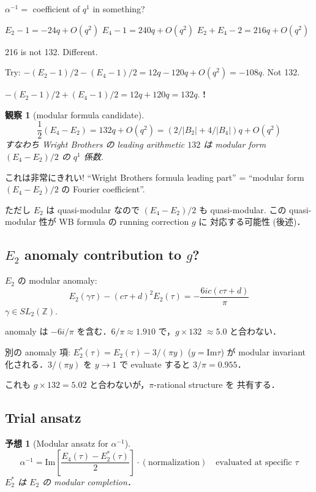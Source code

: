 \documentclass[11pt,a4paper]{article}
\newtheorem{observation}{観察}
\newtheorem{conjecture}{予想}
\begin{document}
$\alpha^{-1} = $ coefficient of $q^1$ in something?

$E_2 - 1 = -24 q + O(q^2)$
$E_4 - 1 = 240 q + O(q^2)$
$E_2 + E_4 - 2 = 216 q + O(q^2)$

216 is not 132. Different.

Try: $-(E_2 - 1)/2 - (E_4 - 1)/2 = 12 q - 120 q + O(q^2) = -108 q$. Not 132.

$-(E_2 - 1)/2 + (E_4 - 1)/2 = 12 q + 120 q = 132 q$. \textbf{!}

\begin{observation}[modular formula candidate]
\begin{equation}
\frac{1}{2}(E_4 - E_2) = 132 q + O(q^2) = (2/|B_2| + 4/|B_4|) q + O(q^2)
\end{equation}
すなわち Wright Brothers の leading arithmetic $132$ は modular form
$(E_4 - E_2)/2$ の $q^1$ 係数.
\end{observation}

これは非常にきれい! ``Wright Brothers formula leading part'' =
``modular form $(E_4 - E_2)/2$ の Fourier coefficient''.

ただし $E_2$ は quasi-modular なので $(E_4 - E_2)/2$ も quasi-modular.
この quasi-modular 性が WB formula の running correction $g$ に
対応する可能性 (後述)．

\subsection{$E_2$ anomaly contribution to $g$?}

$E_2$ の modular anomaly:
\begin{equation}
E_2(\gamma \tau) - (c\tau + d)^2 E_2(\tau) = -\frac{6ic(c\tau+d)}{\pi}
\end{equation}
$\gamma \in SL_2(\mathbb{Z})$.

anomaly は $-6i/\pi$ を含む．$6/\pi \approx 1.910$ で，$g \times 132$
$\approx 5.0$ と合わない．

別の anomaly 項: $E_2^*(\tau) = E_2(\tau) - 3/(\pi y)$ ($y = \text{Im}\tau$)
が modular invariant 化される．$3/(\pi y)$ を $y \to 1$ で evaluate
すると $3/\pi = 0.955$．

これも $g \times 132 = 5.02$ と合わないが，$\pi$-rational structure を
共有する．

\subsection{Trial ansatz}

\begin{conjecture}[Modular ansatz for $\alpha^{-1}$]
\begin{equation}
\alpha^{-1} = \text{Im}\left[\frac{E_4(\tau) - E_2^*(\tau)}{2}\right] \cdot (\text{normalization})
\quad \text{evaluated at specific } \tau
\end{equation}
$E_2^*$ は $E_2$ の modular completion．
\end{conjecture}
\end{document}
